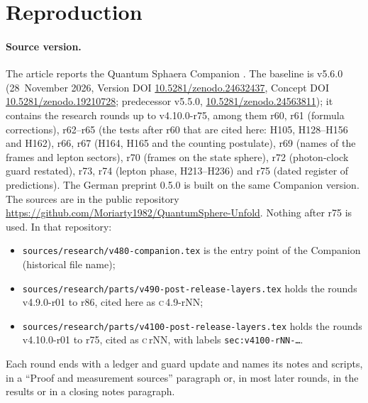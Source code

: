 \section{Reproduction}
\label{sec:repro}

\paragraph{Source version.} The article reports the Quantum Sphaera Companion \cite{QSC}. The baseline is v5.6.0
(28~November 2026, Version DOI \href{https://doi.org/10.5281/zenodo.24632437}{10.5281/zenodo.24632437}, Concept DOI
\href{https://doi.org/10.5281/zenodo.19210728}{10.5281/zenodo.19210728}; predecessor v5.5.0,
\href{https://doi.org/10.5281/zenodo.24563811}{10.5281/zenodo.24563811}); it contains the research rounds
up to v4.10.0-r75, among them r60, r61 (formula corrections), r62--r65 (the tests after r60 that are cited here: H105,
H128--H156 and H162), r66, r67 (H164, H165 and the counting postulate), r69 (names of the frames and lepton sectors), r70 (frames on
the state sphere), r72 (photon-clock guard restated), r73, r74 (lepton phase, H213--H236) and r75 (dated register of predictions).
The German preprint 0.5.0 \cite{QS-preprint-de} is built on the same Companion version. The sources are in the public repository
\url{https://github.com/Moriarty1982/QuantumSphere-Unfold}. Nothing after r75 is used. In that repository:
\begin{itemize}
\item \nolinkurl{sources/research/v480-companion.tex} is the entry point of the Companion (historical file name);
\item \nolinkurl{sources/research/parts/v490-post-release-layers.tex} holds the rounds v4.9.0-r01 to r86, cited here as
  \textsc{c}\,4.9-rNN;
\item \nolinkurl{sources/research/parts/v4100-post-release-layers.tex} holds the rounds v4.10.0-r01 to r75, cited as
  \textsc{c}\,rNN, with labels \texttt{sec:v4100-rNN-\dots}.
\end{itemize}
Each round ends with a ledger and guard update and names its notes and scripts, in a ``Proof and measurement
sources'' paragraph or, in most later rounds, in the results or in a closing notes paragraph.

